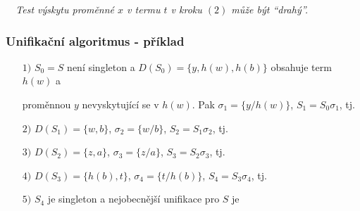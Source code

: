     {\it {}\ \ Test výskytu proměnné $x$ v termu $t$ v kroku $(2)$ může být \emph{``drahý''}.}%
    
    
    
    \subsubsection*{Unifikační algoritmus - příklad}
     \vspace{-2mm}
    
    \vspace{-5mm}
    \begin{enumerate}
    \item[$1)$] $S_0=S$ není singleton a $D(S_0)=\{y,h(w),h(b)\}$ obsahuje term $h(w)$ a
    \smallskip
    
    proměnnou $y$ nevyskytující se v $h(w)$. Pak $\sigma_1=\{y/h(w)\}$,  $S_1=S_0\sigma_1$, tj.
        \vspace{-2mm}
    
        \vspace{-6mm}
    \item[$2)$] $D(S_1)=\{w,b\}$, $\sigma_2=\{w/b\}$, $S_2=S_1\sigma_2$, tj.
    \vspace{-2mm}
    
        \vspace{-6mm}
    \item[$3)$] $D(S_2)=\{z,a\}$, $\sigma_3=\{z/a\}$, $S_3=S_2\sigma_3$, tj.
    \vspace{-2mm}
    
        \vspace{-6mm}
    \item[$4)$] $D(S_3)=\{h(b),t\}$, $\sigma_4=\{t/h(b)\}$, $S_4=S_3\sigma_4$, tj.
    \vspace{-2mm}
    
        \vspace{-6mm}
    \item[$5)$] $S_4$ je singleton a nejobecnější unifikace pro $S$ je
    \vspace{-2mm}
    
        \vspace{-6mm}
    \end{enumerate}
    
